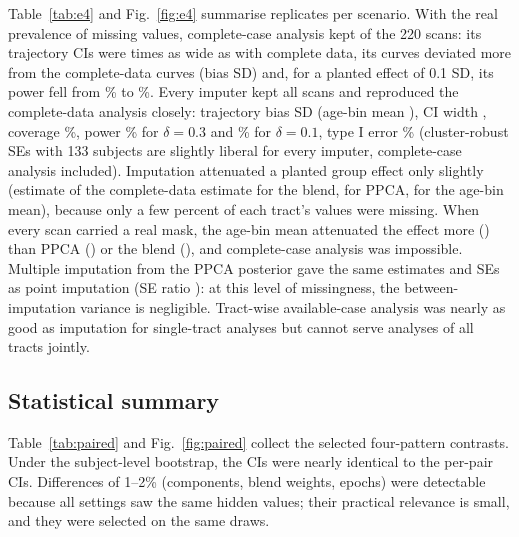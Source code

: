 \documentclass[11pt]{article}
\begin{document}
Table~\ref{tab:e4} and Fig.~\ref{fig:e4} summarise \efMainReps{} replicates per scenario. With the real prevalence of
missing values, complete-case analysis kept \efMainCcN{} of the 220 scans: its trajectory CIs were \efMainCcCi{} times as
wide as with complete data, its curves deviated more from the complete-data curves (bias \efMainCcBias{} SD) and, for a
planted effect of 0.1 SD, its power fell from \efSmallFullPower\% to \efSmallCcPower\%. Every imputer kept all scans and
reproduced the complete-data analysis closely: trajectory bias \efMainBlendBias{} SD (age-bin mean \efMainMeanBias),
CI width \efMainBlendCi{}, coverage \efMainBlendCoverage\%, power \efMainBlendPower\% for $\delta = 0.3$ and
\efSmallBlendPower\% for $\delta = 0.1$, type I error \efMainBlendTypei\% (cluster-robust SEs with 133 subjects are slightly liberal for every
imputer, complete-case analysis included).
Imputation attenuated a planted group effect only slightly (estimate \efMainBlendRelfull{} of the complete-data estimate
for the blend, \efMainPpcaRelfull{} for PPCA, \efMainMeanRelfull{} for the age-bin mean), because only a few percent of
each tract's values were missing. When every scan carried a real mask, the age-bin mean attenuated the effect more
(\efSmallMissMeanRelfull) than PPCA (\efSmallMissPpcaRelfull) or the blend (\efSmallMissBlendRelfull), and complete-case
analysis was impossible. Multiple imputation from the PPCA posterior gave the same estimates and SEs as point imputation
(SE ratio \efMainMiSeratio): at this level of missingness, the between-imputation variance is negligible. Tract-wise
available-case analysis was nearly as good as imputation for single-tract analyses but cannot serve analyses of all
tracts jointly.

\begin{table}[t]
\centering\footnotesize
\caption{E4: downstream analyses on 220 complete BCP scans with real masks transplanted (50 replicates per
scenario). Trajectory: FA and MD tract means $\sim$ spline(log age) on the tracts without a planted effect, against the
complete-data fit. Group effect: planted in 5 tracts.}\label{tab:e4}
\resizebox{\textwidth}{!}{}
\end{table}

\subsection{Statistical summary}

Table~\ref{tab:paired} and Fig.~\ref{fig:paired} collect the selected four-pattern contrasts. Under the subject-level
bootstrap, the CIs were nearly identical to the per-pair CIs. Differences of 1--2\% (components, blend weights, epochs)
were detectable because all settings saw the same hidden values; their practical relevance is small, and they were
selected on the same draws.
\end{document}
